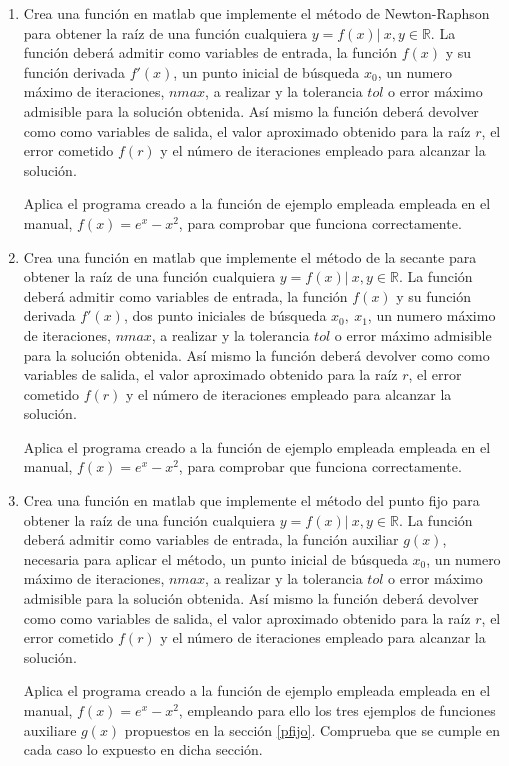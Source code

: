 \begin{enumerate}
\item Crea una función en matlab que implemente el método de  Newton-Raphson para obtener la raíz de una función cualquiera $y = f(x)\vert\  x, y \in \mathbb{R}$. La función deberá admitir como variables de entrada, la función $f(x)$ y su función derivada $f'(x)$, un punto inicial de búsqueda $x_0$, un numero máximo de iteraciones, $nmax$, a realizar y la tolerancia $tol$ o error máximo admisible para la solución obtenida. Así mismo la función deberá devolver como como variables de salida, el valor aproximado obtenido para la raíz $r$, el error cometido $f(r)$ y el número de iteraciones empleado para alcanzar la solución.

Aplica el programa creado a la función de ejemplo empleada empleada en el manual, $f(x) = e^x-x^2$, para comprobar que funciona correctamente.

\item Crea una función en matlab que implemente el método de la secante para obtener la raíz de una función cualquiera $y = f(x)\vert\  x, y \in \mathbb{R}$. La función deberá admitir como variables de entrada, la función $f(x)$ y su función derivada $f'(x)$, dos punto iniciales de búsqueda $x_0,\ x_1$, un numero máximo de iteraciones, $nmax$, a realizar y la tolerancia $tol$ o error máximo admisible para la solución obtenida. Así mismo la función deberá devolver como como variables de salida, el valor aproximado obtenido para la raíz $r$, el error cometido $f(r)$ y el número de iteraciones empleado para alcanzar la solución.

Aplica el programa creado a la función de ejemplo empleada empleada en el manual, $f(x) = e^x-x^2$, para comprobar que funciona correctamente.
\item Crea una función en matlab que implemente el método del punto fijo para obtener la raíz de una función cualquiera $y = f(x)\vert\  x, y \in \mathbb{R}$. La función deberá admitir como variables de entrada, la función auxiliar $g(x)$, necesaria para aplicar el método, un punto inicial de búsqueda $x_0$, un numero máximo de iteraciones, $nmax$, a realizar y la tolerancia $tol$ o error máximo admisible para la solución obtenida. Así mismo la función deberá devolver como como variables de salida, el valor aproximado obtenido para la raíz $r$, el error cometido $f(r)$ y el número de iteraciones empleado para alcanzar la solución.

Aplica el programa creado a la función de ejemplo empleada empleada en el manual, $f(x) = e^x-x^2$, empleando para ello los tres ejemplos de funciones auxiliare $g(x)$ propuestos en la sección \ref{pfijo}. Comprueba que se cumple en cada caso lo expuesto en dicha sección.


\end{enumerate}
